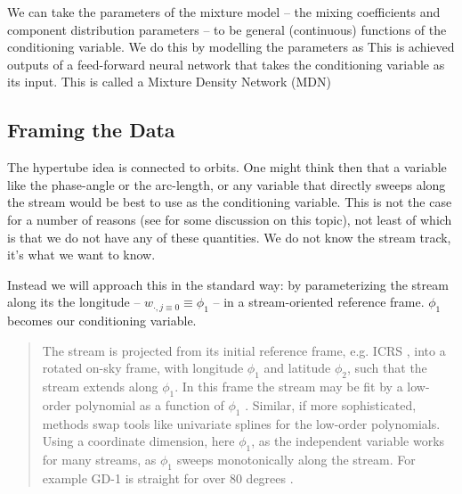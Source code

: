 \documentclass[twocolumn]{aastex631}
\newcommand{\stream}[1]{#1}
\begin{document}
            We can take the parameters of the mixture model -- the mixing coefficients and component distribution parameters -- to be general (continuous) functions of the conditioning variable.
            We do this by modelling the parameters as This is achieved outputs of a feed-forward neural network that takes the conditioning variable as its input. This is called a Mixture Density Network (MDN)



    \subsection{Framing the Data} \label{sub:framing_the_data}

        The hypertube idea is connected to orbits.
        One might think then that a variable like the phase-angle or the arc-length, or any variable that directly sweeps along the stream would be best to use as the conditioning variable.
        This is not the case for a number of reasons (see \cite{StarkmanEtAl2023} for some discussion on this topic), not least of which is that we do not have any of these quantities. We do not know the stream track, it's what we want to know.
        
        Instead we will approach this in the standard way: by parameterizing the stream along its the longitude -- $w_{\cdot, j\equiv0} \equiv \phi_1$ -- in a stream-oriented reference frame.
        $\phi_1$ becomes our conditioning variable.
         

        \begin{quotation}
            The stream is projected from its initial reference frame, e.g. ICRS
            \citep{ICRS1997}, into a rotated on-sky frame, with longitude $\phi_1$ and
            latitude $\phi_2$, such that the stream extends along $\phi_1$. In this frame
            the stream may be fit by a low-order polynomial as a function of $\phi_1$
            \citep[e.g.][]{Bonaca2020}. Similar, if more sophisticated, methods swap tools
            like univariate splines \citep[e.g.][]{Erkal2017, Bonaca2018} for the
            low-order polynomials. Using a coordinate dimension, here $\phi_1$, as the
            independent variable works for many streams, as $\phi_1$ sweeps monotonically
            along the stream. For example \stream{GD-1} is straight for over 80 degrees
            \citep{Webb2019, Price-Whelan2018}.
        \end{quotation}
\end{document}
